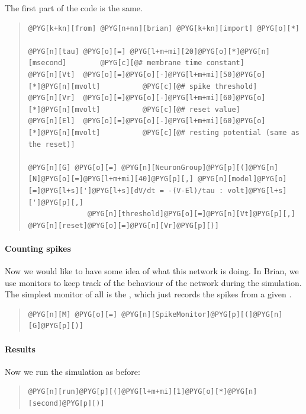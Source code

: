 \documentclass[letterpaper,10pt,english]{manual}
\begin{document}
The first part of the code is the same.
\begin{quote}

\begin{Verbatim}[commandchars=@\[\]]
@PYG[k+kn][from] @PYG[n+nn][brian] @PYG[k+kn][import] @PYG[o][*]

@PYG[n][tau] @PYG[o][=] @PYG[l+m+mi][20]@PYG[o][*]@PYG[n][msecond]        @PYG[c][@# membrane time constant]
@PYG[n][Vt]  @PYG[o][=]@PYG[o][-]@PYG[l+m+mi][50]@PYG[o][*]@PYG[n][mvolt]          @PYG[c][@# spike threshold]
@PYG[n][Vr]  @PYG[o][=]@PYG[o][-]@PYG[l+m+mi][60]@PYG[o][*]@PYG[n][mvolt]          @PYG[c][@# reset value]
@PYG[n][El]  @PYG[o][=]@PYG[o][-]@PYG[l+m+mi][60]@PYG[o][*]@PYG[n][mvolt]          @PYG[c][@# resting potential (same as the reset)]

@PYG[n][G] @PYG[o][=] @PYG[n][NeuronGroup]@PYG[p][(]@PYG[n][N]@PYG[o][=]@PYG[l+m+mi][40]@PYG[p][,] @PYG[n][model]@PYG[o][=]@PYG[l+s][']@PYG[l+s][dV/dt = -(V-El)/tau : volt]@PYG[l+s][']@PYG[p][,]
              @PYG[n][threshold]@PYG[o][=]@PYG[n][Vt]@PYG[p][,] @PYG[n][reset]@PYG[o][=]@PYG[n][Vr]@PYG[p][)]
\end{Verbatim}
\end{quote}


\paragraph{Counting spikes}

Now we would like to have some idea of what this network is
doing. In Brian, we use monitors to keep track of the behaviour
of the network during the simulation. The simplest monitor of
all is the \hyperlink{brian.SpikeMonitor}{}, which just records the spikes from a
given \hyperlink{brian.NeuronGroup}{}.
\begin{quote}

\begin{Verbatim}[commandchars=@\[\]]
@PYG[n][M] @PYG[o][=] @PYG[n][SpikeMonitor]@PYG[p][(]@PYG[n][G]@PYG[p][)]
\end{Verbatim}
\end{quote}


\paragraph{Results}

Now we run the simulation as before:
\begin{quote}

\begin{Verbatim}[commandchars=@\[\]]
@PYG[n][run]@PYG[p][(]@PYG[l+m+mi][1]@PYG[o][*]@PYG[n][second]@PYG[p][)]
\end{Verbatim}
\end{quote}
\end{document}
